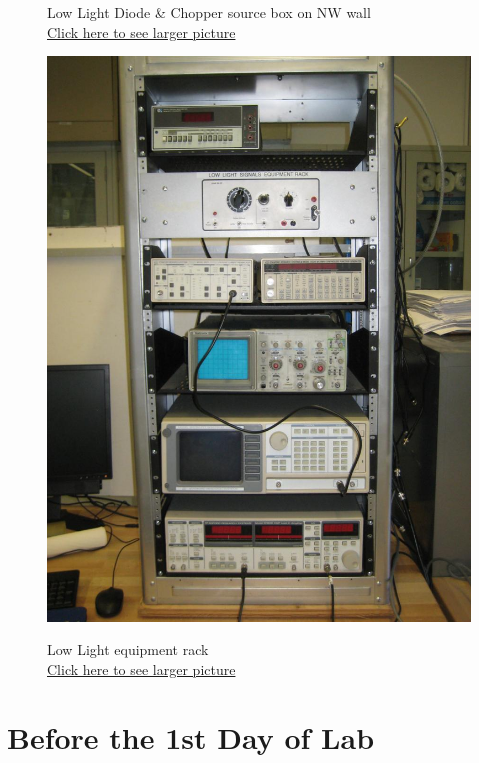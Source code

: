 \documentclass{../lab}
\begin{document}
\begin{figure}[!htb]
  \caption{Low Light Diode \& Chopper source box on NW wall \\
  \href{http://experimentationlab.berkeley.edu/sites/default/files/images/LLS-Source_3439.jpg}{Click here to see larger picture}}
  \label{fig:LLS-Source_3439.jpg}
\endminipage\hfill
{}
  \href{http://experimentationlab.berkeley.edu/sites/default/files/IMG_4088.JPG}{\includegraphics[width=\linewidth,keepaspectratio]{images/IMG_4088.JPG}}
  \caption{Low Light equipment rack \\ \href{http://experimentationlab.berkeley.edu/sites/default/files/IMG_4088.JPG}{Click here to see larger picture}}
  \label{fig:PigCollimator}
\endminipage
\end{figure}




\section{Before the 1st Day of Lab}
\end{document}
